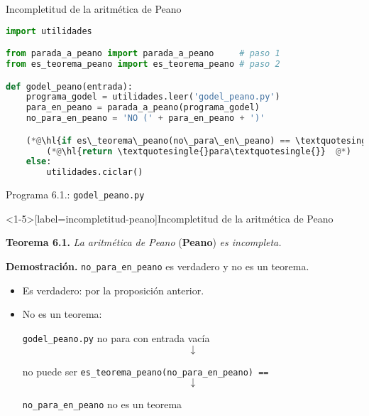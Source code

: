 \documentclass[10pt,xcolor=dvipsnames,aspectratio=169,spanish]{beamer}
\makeatletter
\let\HL\hl
\renewcommand\hl{%
  \let\set@color\beamerorig@set@color
  \let\reset@color\beamerorig@reset@color
  \HL}
\newcommand{\palabra}[1]{\texttt{\textquotesingle{}{#1}\textquotesingle{}}}
\makeatother
\begin{document}
\begin{frame}[fragile]{Incompletitud de la aritmética de Peano}

\begin{lstlisting}[language=Python]
import utilidades

from parada_a_peano import parada_a_peano     # paso 1
from es_teorema_peano import es_teorema_peano # paso 2

def godel_peano(entrada):
    programa_godel = utilidades.leer('godel_peano.py')
    para_en_peano = parada_a_peano(programa_godel)
    no_para_en_peano = 'NO (' + para_en_peano + ')'

    (*@\hl{if es\_teorema\_peano(no\_para\_en\_peano) == \textquotesingle{}sí\textquotesingle{}:}  @*)
        (*@\hl{return \textquotesingle{}para\textquotesingle{}}  @*)
    else:
        utilidades.ciclar()
\end{lstlisting}
\vspace*{-4mm}
\begin{center}
{\small Programa 6.1.: \texttt{godel\_peano.py}}
\end{center}

\end{frame}



\begin{frame}<1-5>[label=incompletitud-peano]{Incompletitud de la aritmética de Peano}

\textbf{Teorema 6.1.} \emph{La aritmética de Peano} (\textbf{Peano}) \emph{es incompleta.}

\vspace{5mm}

\pause

\textbf{Demostración.} \texttt{no\_para\_en\_peano} es verdadero y no es un teorema.

\begin{itemize}

    \pause
    \item Es verdadero: por la proposición anterior.

    \pause
    \item No es un teorema:

    \begin{center}
    \pause
\texttt{godel\_peano.py} no para con entrada vacía
\vspace*{-2mm}
\pause
$$\downarrow$$

\vspace*{-2mm}
no puede ser \texttt{es\_teorema\_peano(no\_para\_en\_peano) == \palabra{sí}}
\vspace*{-2mm}
\pause
$$\downarrow$$

\vspace*{-2mm}
\texttt{no\_para\_en\_peano} no es un teorema
\end{center}

\vspace*{-5.5mm}

\pause[7]{\hfill\square}

\end{itemize}

\end{frame}
\end{document}
